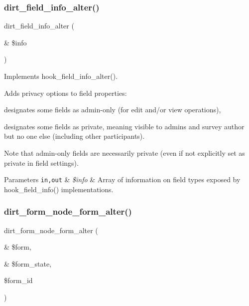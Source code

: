 \subsubsection{\texorpdfstring{dirt\+\_\+field\+\_\+info\+\_\+alter()}{dirt\_field\_info\_alter()}}
{\footnotesize\ttfamily dirt\+\_\+field\+\_\+info\+\_\+alter (\begin{DoxyParamCaption}\item[{\&}]{\$info }\end{DoxyParamCaption})}

Implements hook\+\_\+field\+\_\+info\+\_\+alter().

Adds privacy options to field properties\+:
\begin{DoxyItemize}
\item designates some fields as admin-\/only (for edit and/or view operations),
\item designates some fields as private, meaning visible to admins and survey author but no one else (including other participants).
\end{DoxyItemize}

Note that admin-\/only fields are necessarily private (even if not explicitly set as private in field settings).


\begin{DoxyParams}[1]{Parameters}
\mbox{\tt in,out}  & {\em \$info} & Array of information on field types exposed by hook\+\_\+field\+\_\+info() implementations. \\
\hline
\end{DoxyParams}
\mbox{\label{dirt_8module_aab2461d317b8f24bc997fe1b326341ce}} 
\subsubsection{\texorpdfstring{dirt\+\_\+form\+\_\+node\+\_\+form\+\_\+alter()}{dirt\_form\_node\_form\_alter()}}
{\footnotesize\ttfamily dirt\+\_\+form\+\_\+node\+\_\+form\+\_\+alter (\begin{DoxyParamCaption}\item[{\&}]{\$form,  }\item[{\&}]{\$form\+\_\+state,  }\item[{}]{\$form\+\_\+id }\end{DoxyParamCaption})}

